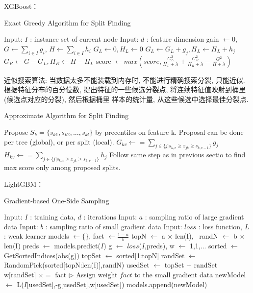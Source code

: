 \documentclass[a4paper,UTF8]{article}
\begin{document}
XGBoost：
\begin{algorithm}[H]
  \caption{Exact Greedy Algorithm for Split Finding}
  \begin{algorithmic}
    \STATE Input: $I$ : instance set of current node
    \STATE Input: $d$ : feature dimension
    \STATE gain $\leftarrow 0$, $G \leftarrow \sum_{i\in I}g_i$, $H \leftarrow \sum_{i\in I}h_i$
        \STATE $G_L \leftarrow 0, H_L\leftarrow 0$
          \STATE $G_L \leftarrow G_L+g_j, H_L\leftarrow H_L+h_j$
          \STATE $G_R \leftarrow G-G_L, H_R\leftarrow H-H_L$
          \STATE score $\leftarrow max(score, \frac{G_L^2}{H_L+\lambda}+\frac{G_R^2}{H_R+\lambda}-\frac{G^2}{H+\lambda})$
        \ENDFOR
      \ENDFOR
  \end{algorithmic}
\end{algorithm}

近似搜索算法: 当数据太多不能装载到内存时, 不能进行精确搜索分裂, 只能近似. 
根据特征分布的百分位数, 提出特征的一些候选分裂点, 
将连续特征值映射到桶里(候选点对应的分裂), 然后根据桶里
样本的统计量, 从这些候选中选择最佳分裂点.
\begin{algorithm}[H]
  \caption{Approximate Algorithm for Split Finding}
  \begin{algorithmic}
      \STATE Propose $S_k=\{s_{k1}, s_{k2},...,s_{kl}\}$ by precentiles on feature k.
      \STATE Proposal can be done per tree (global), or per split (local).
    \ENDFOR
        \STATE $G_{kv} \leftarrow=\sum_{j\in\{j|s_{k,v}\geq x_{jk}\geq s_{k,v-1}\}}g_j$
        \STATE $H_{kv} \leftarrow=\sum_{j\in\{j|s_{k,v}\geq x_{jk}\geq s_{k,v-1}\}}h_j$
    \ENDFOR
    \STATE Follow same step as in previous sectio to find max
    \STATE score only among proposed splits.
  \end{algorithmic}
\end{algorithm}

LightGBM：
\begin{algorithm}[H]
  \caption{Gradient-based One-Side Sampling}
  \begin{algorithmic}
    \STATE Input: $I$ : training data, $d$ : iterations
    \STATE Input: $a$ : sampling ratio of large gradient data
    \STATE Input: $b$ : sampling ratio of small gradient data
    \STATE Input: $loss$ : loss function, $L$ : weak learner
    \STATE models $\leftarrow \{\}$, fact $\leftarrow \frac{1-a}{b}$
    \STATE topN $\leftarrow $ a $\times$ len(I), \ randN $\leftarrow$ b $\times$ len(I)
        \STATE preds $\leftarrow$ models.predict($I$)
        \STATE g $\leftarrow$ $loss$($I$,preds), w $\leftarrow$ {1,1,...}
        \STATE sorted $\leftarrow$ GetSortedIndices(abs(g))
        \STATE topSet $\leftarrow$ sorted[1:topN]
        \STATE randSet $\leftarrow$ RandomPick(sorted[topN:len(I)],randN)
        \STATE usedSet $\leftarrow$ topSet + randSet
        \STATE w[randSet] $\times = $ fact $\rhd$ Assign  weight $fact$  to the small gradient data
        \STATE newModel $\leftarrow$ L($I$[usedSet],-g[usedSet],w[usedSet])
        \STATE models.append(newModel)
      \ENDFOR
  \end{algorithmic}
\end{algorithm}
  
\end{document}
